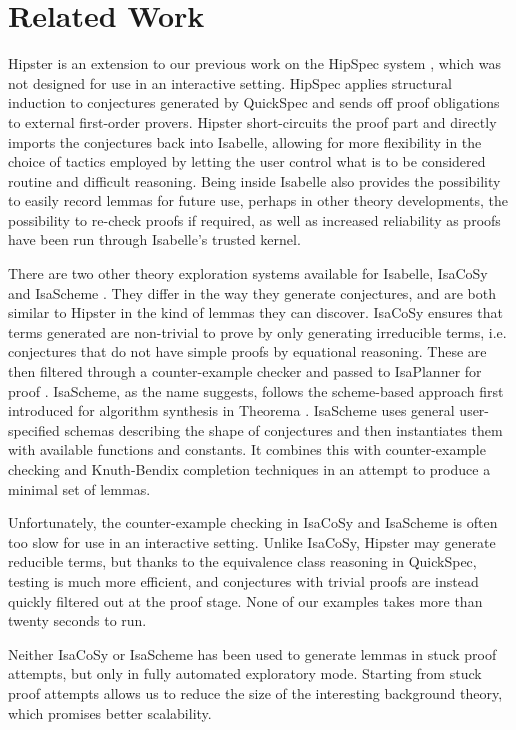 \section{Related Work}
\label{sec:related}


Hipster is an extension to our previous work on the HipSpec system
\cite{hipspecCADE}, which was not designed for use in an interactive
setting. HipSpec applies structural induction to conjectures generated
by QuickSpec and sends off proof obligations to external first-order
provers. Hipster short-circuits the proof part and directly imports
the conjectures back into Isabelle, allowing for more flexibility in
the choice of tactics employed by letting the user control what is to
be considered routine and difficult reasoning. Being inside Isabelle
also provides the possibility to easily record lemmas for future use,
perhaps in other theory developments, the possibility to re-check
proofs if required, as well as increased reliability as proofs have
been run through Isabelle's trusted kernel.

There are two other theory exploration systems available for Isabelle, IsaCoSy \cite{isacosy} and IsaScheme \cite{isascheme}. They differ in the way they generate conjectures, and are both similar to Hipster in the kind of lemmas they can discover. 
IsaCoSy ensures that terms generated are non-trivial to prove by only generating irreducible terms, i.e. conjectures that do not have simple proofs by equational reasoning. These are then filtered through a counter-example checker and passed to IsaPlanner for proof \cite{isaplanner}. IsaScheme, as the name suggests, follows the scheme-based approach first introduced for algorithm synthesis in Theorema \cite{theorema}. IsaScheme uses general user-specified schemas describing the shape of conjectures and then instantiates them with available functions and constants. It combines this with counter-example checking and Knuth-Bendix completion techniques in an attempt to produce a minimal set of lemmas.

Unfortunately, the counter-example checking in IsaCoSy and IsaScheme
is often too slow for use in an interactive setting. Unlike IsaCoSy,
Hipster may generate reducible terms, but thanks to the equivalence
class reasoning in QuickSpec, testing is much more efficient, and
conjectures with trivial proofs are instead quickly filtered out at
the proof stage. None of our examples takes more than twenty seconds
to run.

Neither IsaCoSy or IsaScheme has been used to generate lemmas in stuck proof attempts, but only in fully automated exploratory mode.
Starting from stuck proof attempts allows us to reduce the size of the
interesting background theory, which promises better scalability.

